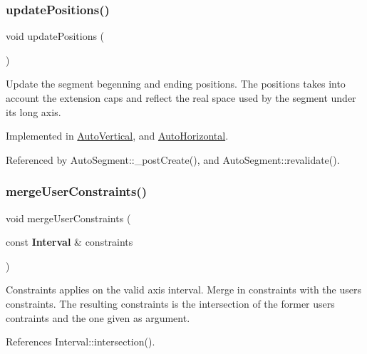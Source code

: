 \subsubsection{\texorpdfstring{update\+Positions()}{updatePositions()}}
{\footnotesize\ttfamily void update\+Positions (\begin{DoxyParamCaption}{ }\end{DoxyParamCaption})\hspace{0.3cm}{\ttfamily [pure virtual]}}

Update the segment begenning and ending positions. The positions takes into account the extension caps and reflect the real space used by the segment under it\textquotesingle{}s long axis. 

Implemented in \hyperlink{classKatabatic_1_1AutoVertical_a9662a77c2ed8553d6a0312c5292060ad}{Auto\+Vertical}, and \hyperlink{classKatabatic_1_1AutoHorizontal_a9662a77c2ed8553d6a0312c5292060ad}{Auto\+Horizontal}.



Referenced by Auto\+Segment\+::\+\_\+post\+Create(), and Auto\+Segment\+::revalidate().

\mbox{\label{classKatabatic_1_1AutoSegment_ae82ffef92ad9ffdc5da5e0c1830d9537}} 
\subsubsection{\texorpdfstring{merge\+User\+Constraints()}{mergeUserConstraints()}}
{\footnotesize\ttfamily void merge\+User\+Constraints (\begin{DoxyParamCaption}\item[{const \textbf{ Interval} \&}]{constraints }\end{DoxyParamCaption})}

Constraints applies on the valid axis interval. Merge in {\ttfamily constraints} with the user\textquotesingle{}s constraints. The resulting constraints is the intersection of the former user\textquotesingle{}s contraints and the one given as argument. 

References Interval\+::intersection().

\mbox{\label{classKatabatic_1_1AutoSegment_ac8768352909d37ebad1c06c9cf4ef8bb}} 

